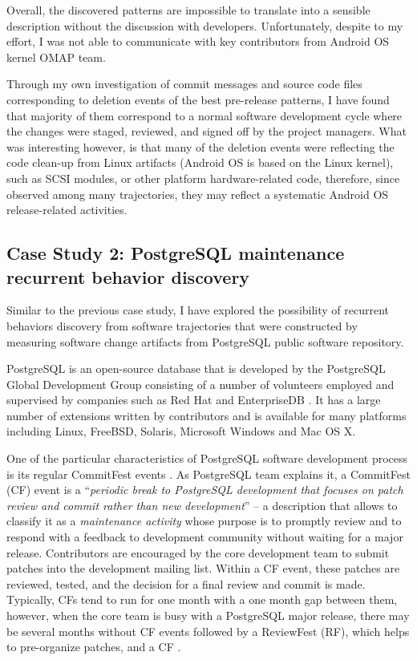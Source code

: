 Overall, the discovered patterns are impossible to translate into a sensible description without the discussion with developers. Unfortunately, despite to my effort, I was not able to communicate with key contributors from Android OS kernel OMAP team. 

Through my own investigation of commit messages and source code files corresponding to deletion events of the best pre-release patterns, I have found that majority of them correspond to a normal software development cycle where the changes were staged, reviewed, and signed off by the project managers. What was interesting however, is that many of the deletion events were reflecting the code clean-up from Linux artifacts (Android OS is based on the Linux kernel), such as SCSI modules, or other platform hardware-related code, therefore, since observed among many trajectories, they may reflect a systematic Android OS release-related activities.

\clearpage

\subsection{Case Study 2: PostgreSQL maintenance recurrent behavior discovery}\label{case2}
Similar to the previous case study, I have explored the possibility of recurrent behaviors discovery from software trajectories that were constructed by measuring software change artifacts from PostgreSQL public software repository. 
 
PostgreSQL is an open-source database that is developed by the PostgreSQL Global Development Group consisting of a number of volunteers employed and supervised by companies such as Red Hat and EnterpriseDB \cite{postgre-contrib}. It has a large number of extensions written by contributors and is available for many platforms including Linux, FreeBSD, Solaris, Microsoft Windows and Mac OS X.

One of the particular characteristics of PostgreSQL software development process is its regular CommitFest events \cite{commit-fest}. As PostgreSQL team explains it, a CommitFest (CF) event is a ``\textit{periodic break to PostgreSQL development that focuses on patch review and commit rather than new development}'' -- a description that allows to classify it as a \textit{maintenance activity} whose purpose is to promptly review and to respond with a feedback to development community without waiting for a major release. Contributors are encouraged by the core development team to submit patches into the development mailing list. Within a CF event, these patches are reviewed, tested, and the decision for a final review and commit is made.  Typically, CFs tend to run for one month with a one month gap between them, however, when the core team is busy with a PostgreSQL major release, there may be several months without CF events followed by a ReviewFest (RF), which helps to pre-organize patches, and a CF . 

